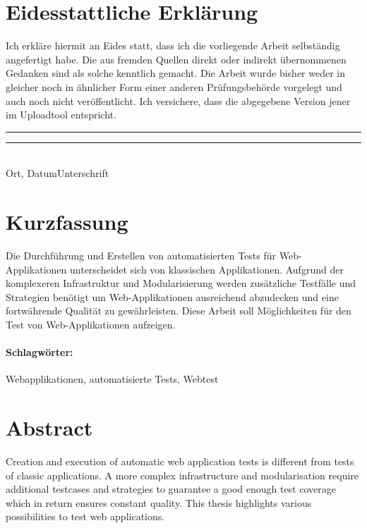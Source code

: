 \documentclass[a4paper,bibtotoc,oneside]{scrbook}
\begin{document}
\newpage


\section*{Eidesstattliche Erklärung}\thispagestyle{empty}
\glqq Ich erkläre hiermit an Eides statt, dass ich die vorliegende Arbeit selbständig angefertigt habe. 
Die aus fremden Quellen direkt oder indirekt übernommenen Gedanken sind als solche kenntlich gemacht. 
Die Arbeit wurde bisher weder in gleicher noch in ähnlicher Form einer anderen Prüfungsbehörde vorgelegt
und auch noch nicht veröffentlicht. Ich versichere, dass die abgegebene Version jener im Uploadtool entspricht.\grqq\\[5\baselineskip]
\rule{5cm}{0.2pt}\hfill\rule{5cm}{0.2pt}\\
\phantom{Datum }Ort, Datum\hfill Unterschrift\hspace{15mm}

\newpage


\section*{Kurzfassung}\thispagestyle{empty}
Die Durchführung und Erstellen von automatisierten Tests für Web-Applikationen unterscheidet sich von klassischen Applikationen. Aufgrund der komplexeren Infrastruktur und Modularisierung werden zusätzliche Testfälle und Strategien benötigt um Web-Applikationen ausreichend abzudecken und eine fortwährende Qualität zu gewährleisten. Diese Arbeit soll Möglichkeiten für den Test von Web-Applikationen aufzeigen.

\vfill
\paragraph*{Schlagwörter:} Webapplikationen, automatisierte Tests, Webtest


\newpage

\section*{Abstract}\thispagestyle{empty}
Creation and execution of automatic web application tests is different from tests of classic applications. A more complex infrastructure and modularisation require additional testcases and strategies to guarantee a good enough test coverage which in return ensures constant quality. This thesis highlights various possibilities to test web applications.
\end{document}
